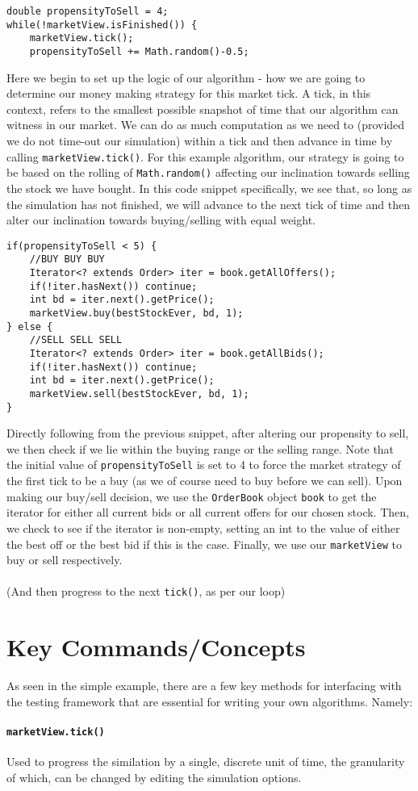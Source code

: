 \documentclass[11pt]{article}
\begin{document}
\begin{lstlisting}
double propensityToSell = 4;
while(!marketView.isFinished()) {
	marketView.tick();
	propensityToSell += Math.random()-0.5;
\end{lstlisting}
Here we begin to set up the logic of our algorithm - how we are going to determine our money making strategy for this market tick. A tick, in this context, refers to the smallest possible snapshot of time that our algorithm can witness in our market. We can do as much computation as we need to (provided we do not time-out our simulation) within a tick and then advance in time by calling \texttt{marketView.tick()}. For this example algorithm, our strategy is going to be based on the rolling of \texttt{Math.random()} affecting our inclination towards selling the stock we have bought. In this code snippet specifically, we see that, so long as the simulation has not finished, we will advance to the next tick of time and then alter our inclination towards buying/selling with equal weight.\\

\begin{lstlisting}
if(propensityToSell < 5) {
	//BUY BUY BUY
	Iterator<? extends Order> iter = book.getAllOffers();
	if(!iter.hasNext()) continue;
	int bd = iter.next().getPrice();
	marketView.buy(bestStockEver, bd, 1);
} else {
	//SELL SELL SELL
	Iterator<? extends Order> iter = book.getAllBids();
	if(!iter.hasNext()) continue;
	int bd = iter.next().getPrice();
	marketView.sell(bestStockEver, bd, 1);
}
\end{lstlisting}
Directly following from the previous snippet, after altering our propensity to sell, we then check if we lie within the buying range or the selling range. Note that the initial value of \texttt{propensityToSell} is set to 4 to force the market strategy of the first tick to be a buy (as we of course need to buy before we can sell). Upon making our buy/sell decision, we use the \texttt{OrderBook} object \texttt{book} to get the iterator for either all current bids or all current offers for our chosen stock. Then, we check to see if the iterator is non-empty, setting an int to the value of either the best off or the best bid if this is the case. Finally, we use our \texttt{marketView} to buy or sell respectively.\\\\(And then progress to the next \texttt{tick()}, as per our loop)

\section{Key Commands/Concepts}
As seen in the simple example, there are a few key methods for interfacing with the testing framework that are essential for writing your own algorithms. Namely:\paragraph{\texttt{marketView.tick()}} Used to progress the similation by a single, discrete unit of time, the granularity of which, can be changed by editing the simulation options.
\end{document}

